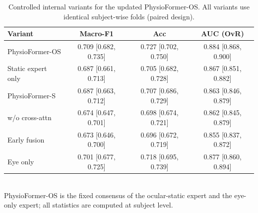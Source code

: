 \begin{table}[htbp]
\centering
\caption{Controlled internal variants for the updated PhysioFormer-OS. All variants use identical subject-wise folds (paired design).}
\label{tab:ablation}
\begin{tabular}{lccc}
\toprule
Variant & Macro-F1 & Acc & AUC (OvR) \\
\midrule
PhysioFormer-OS & 0.709 [0.682, 0.735] & 0.727 [0.702, 0.750] & 0.884 [0.868, 0.900] \\
Static expert only & 0.687 [0.661, 0.713] & 0.705 [0.682, 0.728] & 0.867 [0.851, 0.882] \\
PhysioFormer-S & 0.687 [0.663, 0.712] & 0.707 [0.686, 0.729] & 0.863 [0.846, 0.879] \\
w/o cross-attn & 0.674 [0.647, 0.701] & 0.698 [0.674, 0.721] & 0.862 [0.845, 0.879] \\
Early fusion & 0.673 [0.646, 0.700] & 0.696 [0.672, 0.719] & 0.855 [0.837, 0.872] \\
Eye only & 0.701 [0.677, 0.725] & 0.718 [0.695, 0.739] & 0.877 [0.860, 0.894] \\
\bottomrule
\end{tabular}
\\\footnotesize{PhysioFormer-OS is the fixed consensus of the ocular-static expert and the eye-only expert; all statistics are computed at subject level.}
\end{table}

